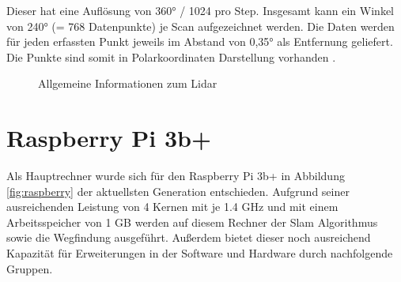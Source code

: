 Dieser hat eine Auflösung von 360° / 1024 pro Step. Insgesamt kann ein Winkel von 240° (= 768 Datenpunkte) je Scan aufgezeichnet werden. Die Daten werden für jeden erfassten Punkt jeweils im Abstand von 0,35° als Entfernung geliefert. Die Punkte sind somit in Polarkoordinaten Darstellung vorhanden \cite{hokuyo.2018}.


\begin{figure}[htbp]
  \caption{Allgemeine Informationen zum Lidar}
  \vspace{1cm}
\end{figure}








\section{Raspberry Pi 3b+}

Als Hauptrechner wurde sich für den Raspberry Pi 3b+ in Abbildung \ref{fig:raspberry} der aktuellsten Generation entschieden. Aufgrund seiner ausreichenden Leistung von 4 Kernen mit je 1.4 GHz und mit einem Arbeitsspeicher von 1 GB werden auf diesem Rechner der Slam Algorithmus sowie die Wegfindung ausgeführt. Außerdem bietet dieser noch ausreichend Kapazität für Erweiterungen in der Software und Hardware durch nachfolgende Gruppen.  


